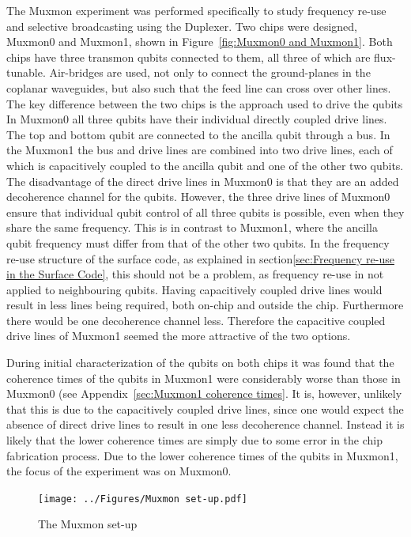       The Muxmon experiment was performed specifically to study frequency re-use and selective broadcasting using the Duplexer. Two chips were designed, Muxmon0 and Muxmon1, shown in Figure~\ref{fig:Muxmon0 and Muxmon1}. Both chips have three transmon qubits connected to them, all three of which are flux-tunable. Air-bridges are used, not only to connect the ground-planes in the coplanar waveguides, but also such that the feed line can cross over other lines. The key difference between the two chips is the approach used to drive the qubits In Muxmon0 all three qubits have their individual directly coupled drive lines. The top and bottom qubit are connected to the ancilla qubit through a bus. In the Muxmon1 the bus and drive lines are combined into two drive lines, each of which is capacitively coupled to the ancilla qubit and one of the other two qubits. The disadvantage of the direct drive lines in Muxmon0 is that they are an added decoherence channel for the qubits. However, the three drive lines of Muxmon0 ensure that individual qubit control of all three qubits is possible, even when they share the same frequency. This is in contrast to Muxmon1, where the ancilla qubit frequency must differ from that of the other two qubits. In the frequency re-use structure of the surface code, as explained in section\ref{sec:Frequency re-use in the Surface Code}, this should not be a problem, as frequency re-use in not applied to neighbouring qubits. Having capacitively coupled drive lines would result in less lines being required, both on-chip and outside the chip. Furthermore there would be one decoherence channel less. Therefore the capacitive coupled drive lines of Muxmon1 seemed the more attractive of the two options.

      During initial characterization of the qubits on both chips it was found that the coherence times of the qubits in Muxmon1 were considerably worse than those in Muxmon0 (see Appendix~\ref{sec:Muxmon1 coherence times}. It is, however, unlikely that this is due to the capacitively coupled drive lines, since one would expect the absence of direct drive lines to result in one less decoherence channel. Instead it is likely that the lower coherence times are simply due to some error in the chip fabrication process. Due to the lower coherence times of the qubits in Muxmon1, the focus of the experiment was on Muxmon0.

      \begin{figure}[tb]
        \centering
        \texttt{[image: ../Figures/Muxmon set-up.pdf]}
        \caption{The Muxmon set-up}
        \label{fig:Muxmon set-up}
      \end{figure}

